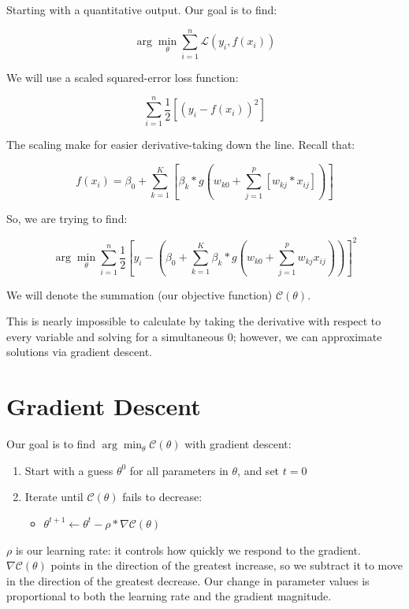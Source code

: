 \documentclass[
]{book}
\providecommand{\tightlist}{%
  \setlength{\itemsep}{0pt}\setlength{\parskip}{0pt}}
\begin{document}
Starting with a quantitative output. Our goal is to find:

\[\arg \min_{\theta} \sum_{i = 1}^n \mathcal L (y_i, f(x_i))\]

We will use a scaled squared-error loss function:

\[\sum_{i = 1}^n \frac{1}{2} \left[(y_i - f(x_i))^2\right]\]

The scaling make for easier derivative-taking down the line. Recall that:

\[f(x_i) = \beta_0 + \sum_{k = 1}^K \left[\beta_k * g\left(w_{k0} + \sum_{j = 1}^p[w_{kj} * x_{ij}]\right)\right]\]

So, we are trying to find:

\[\arg \min_{\theta} \sum_{i = 1}^n \frac{1}{2} \left[y_i - \left(\beta_0 + \sum_{k = 1}^K \beta_k * g(w_{k0} + \sum_{j = 1}^p w_{kj} x_{ij})\right)\right]^2\]

We will denote the summation (our objective function) \(\mathcal{C} (\theta)\).

This is nearly impossible to calculate by taking the derivative with respect to every variable and solving for a simultaneous 0; however, we can approximate solutions via gradient descent.

\hypertarget{gradient-descent}{%
\section{Gradient Descent}\label{gradient-descent}}

Our goal is to find \(\arg \min_{\theta} \mathcal{C} (\theta)\) with gradient descent:

\begin{enumerate}
\def\labelenumi{\arabic{enumi}.}
\tightlist
\item
  Start with a guess \(\theta^0\) for all parameters in \(\theta\), and set \(t = 0\)
\item
  Iterate until \(\mathcal{C} (\theta)\) fails to decrease:

  \begin{itemize}
  \tightlist
  \item
    \(\theta^{t + 1} \leftarrow \theta^t - \rho * \nabla\mathcal{C} (\theta)\)
  \end{itemize}
\end{enumerate}

\(\rho\) is our learning rate: it controls how quickly we respond to the gradient. \(\nabla\mathcal{C} (\theta)\) points in the direction of the greatest increase, so we subtract it to move in the direction of the greatest decrease. Our change in parameter values is proportional to both the learning rate and the gradient magnitude.
\end{document}
